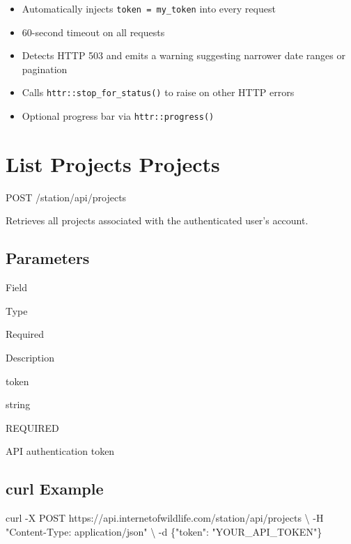 \documentclass[
]{book}
\newenvironment{Shaded}{\begin{snugshade}}{\end{snugshade}}
\newcommand{\AttributeTok}[1]{\textcolor[rgb]{0.13,0.29,0.53}{#1}}
\newcommand{\DataTypeTok}[1]{\textcolor[rgb]{0.13,0.29,0.53}{#1}}
\newcommand{\ExtensionTok}[1]{#1}
\newcommand{\NormalTok}[1]{#1}
\newcommand{\StringTok}[1]{\textcolor[rgb]{0.31,0.60,0.02}{#1}}
\providecommand{\tightlist}{%
  \setlength{\itemsep}{0pt}\setlength{\parskip}{0pt}}
\begin{document}
\begin{itemize}
\tightlist
\item
  Automatically injects \texttt{token\ =\ my\_token} into every request
\item
  60-second timeout on all requests
\item
  Detects HTTP 503 and emits a warning suggesting narrower date ranges or pagination
\item
  Calls \texttt{httr::stop\_for\_status()} to raise on other HTTP errors
\item
  Optional progress bar via \texttt{httr::progress()}
\end{itemize}

\section{\texorpdfstring{List Projects {Projects}}{List Projects Projects}}\label{list-projects-projects}

{POST}
{/station/api/projects}

Retrieves all projects associated with the authenticated user's account.

\subsection{Parameters}\label{parameters}

Field

Type

Required

Description

token

{string}

{REQUIRED}

API authentication token

\subsection{curl Example}\label{curl-example}

\begin{Shaded}
\begin{Highlighting}[]
\ExtensionTok{curl} \AttributeTok{{-}X}\NormalTok{ POST https://api.internetofwildlife.com/station/api/projects }\DataTypeTok{\textbackslash{}}
  \AttributeTok{{-}H} \StringTok{"Content{-}Type: application/json"} \DataTypeTok{\textbackslash{}}
  \AttributeTok{{-}d} \StringTok{\textquotesingle{}\{"token": "YOUR\_API\_TOKEN"\}\textquotesingle{}}
\end{Highlighting}
\end{Shaded}
\end{document}
